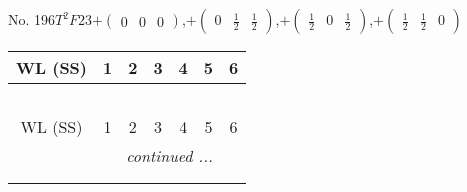 \documentclass[fleqn,9pt,landscape]{jsarticle}
\begin{document}
\newpage
No. 196\quad$T_{}^{2}$\quad$F23$\quad[ cubic ]\quad$+\begin{pmatrix} 0 & 0 & 0 \end{pmatrix}$,\quad $+\begin{pmatrix} 0 & \frac{1}{2} & \frac{1}{2} \end{pmatrix}$,\quad $+\begin{pmatrix} \frac{1}{2} & 0 & \frac{1}{2} \end{pmatrix}$,\quad $+\begin{pmatrix} \frac{1}{2} & \frac{1}{2} & 0 \end{pmatrix}$
\begin{center}
\renewcommand{\arraystretch}{1.2}
\begin{longtable}{ccccccc}
 \hline \hline
WL (SS) & 1 & 2 & 3 & 4 & 5 & 6 \\ \hline \endfirsthead

\multicolumn{6}{l}{\tablename\ \thetable{}} \\
 \hline \hline
WL (SS) & 1 & 2 & 3 & 4 & 5 & 6 \\ \hline \endhead

 \hline \hline
\multicolumn{6}{r}{\footnotesize\it continued ...} \\ \endfoot

 \hline \hline
\multicolumn{6}{r}{} \\ \endlastfoot


\end{longtable}
\end{center}
\end{document}
